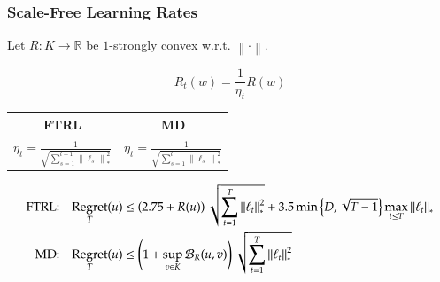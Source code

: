 \documentclass[usenames,dvipsnames]{beamer}
\DeclareMathOperator{\Regret}{Regret}
\newcommand{\R}{\mathbb{R}}
\newcommand{\norm}[1]{\left\|#1\right\|}
\newcommand{\Breg}{\mathcal{B}}
\begin{document}
\begin{frame}
\frametitle{Scale-Free Learning Rates}
Let $R:K \to \R$ be $1$-strongly convex w.r.t. $\norm{\cdot}$.

\vspace{0.2cm}

\begin{minipage}{4cm}
$$
R_t(w) = \frac{1}{\eta_t} R(w)
$$
\end{minipage}
%
\begin{minipage}{5cm}
\begin{center}
\def\arraystretch{2}%
\everymath{\displaystyle}
\begin{tabular}{c|c}
FTRL & MD \\ \hline
$\eta_t = \frac{1}{\sqrt{\sum_{s=1}^{t-1} \norm{\ell_s}_*^2}}$ &  $\eta_t = \frac{1}{\sqrt{\sum_{s=1}^t \norm{\ell_s}_*^2}}$ \\
\end{tabular}
\end{center}
\end{minipage}

\pause

\vspace{0.5cm}

\begin{center}
\fontsize{9pt}{10}\selectfont
\begin{align*}
\textsc{FTRL:} & & \Regret_T(u) & \le \left(2.75 + R(u)\right) \sqrt{\sum_{t=1}^T \norm{\ell_t}_*^2} + 3.5 \min \left\{ D, \sqrt{T-1} \right\} \max_{t \le T} \norm{\ell_t}_* \\
\textsc{MD:} & & \Regret_T(u) & \le \left(1 + \sup_{v \in K} \Breg_{R}(u,v) \right) \sqrt{\sum_{t=1}^T \norm{\ell_t}_*^2}
\end{align*}
\end{center}

\end{frame}
\end{document}
